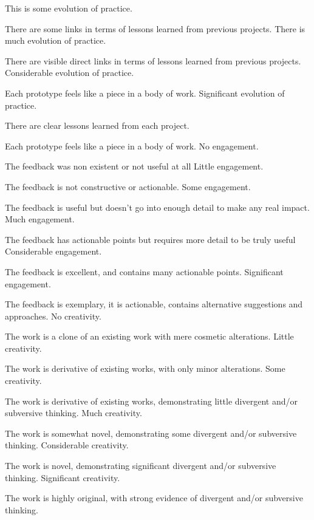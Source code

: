 \documentclass{../../fal_assignment}
\begin{document}
\begin{markingrubric}
	\grade This is some evolution of practice.
	\par There are some links in terms of lessons learned from previous projects.
	\grade There is much evolution of practice.
	\par There are visible direct links in terms of lessons learned from previous projects.
	\grade Considerable evolution of practice.
	\par Each prototype feels like a piece in a body of work.
	\grade Significant evolution of practice.
	\par There are clear lessons learned from each project.
	\par Each prototype feels like a piece in a body of work.
	\grade\fail No engagement.
	\par The feedback was non existent or not useful at all
	\grade Little engagement.
	\par The feedback is not constructive or actionable.
	\grade Some engagement.
	\par The feedback is useful but doesn't go into enough detail to make any real impact.
	\grade Much engagement.
	\par The feedback has actionable points but requires more detail to be truly useful
	\grade Considerable engagement.
	\par The feedback is excellent, and contains many actionable points.
	\grade Significant engagement.
	\par The feedback is exemplary, it is actionable, contains alternative suggestions and approaches.
	\grade\fail No creativity.
	\par The work is a clone of an existing work with mere cosmetic alterations.
	\grade Little creativity.
	\par The work is derivative of existing works, with only minor alterations.
	\grade Some creativity.
	\par The work is derivative of existing works, demonstrating little divergent and/or subversive thinking.
	\grade Much creativity.
	\par The work is somewhat novel, demonstrating some divergent and/or subversive thinking.
	\grade Considerable creativity.
	\par The work is novel, demonstrating significant divergent and/or subversive thinking.
	\grade Significant creativity.
	\par The work is highly original, with strong evidence of divergent and/or subversive thinking.

\end{markingrubric}
\end{document}
